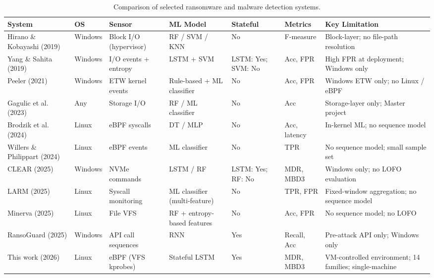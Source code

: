\begin{table}[htbp]
\centering
\small
\caption{Comparison of selected ransomware and malware detection systems.}\label{tab:2-1}
\begin{tabularx}{\textwidth}{XllXllX}
\hline
\textbf{System} & \textbf{OS} & \textbf{Sensor} & \textbf{ML Model} & \textbf{Stateful} & \textbf{Metrics} & \textbf{Key Limitation} \\
\hline
Hirano \& Kobayashi \cite{ref26} (2019) & Windows & Block I/\allowbreak{}O (hypervisor) & RF /\allowbreak{} SVM /\allowbreak{} KNN & No & F-measure & Block-layer; no file-path resolution \\
Yang \& Sahita \cite{ref29} (2019) & Windows & I/\allowbreak{}O events + entropy & LSTM + SVM & LSTM: Yes; SVM: No & Acc, FPR & High FPR at deployment; Windows only \\
Peeler \cite{ref14} (2021) & Windows & ETW kernel events & Rule-based + ML classifier & No & Acc, FPR & Windows ETW only; no Linux /\allowbreak{} eBPF \\
Gagulic et al. \cite{ref25} (2023) & Any & Storage I/\allowbreak{}O & RF /\allowbreak{} ML classifier & No & Acc & Storage-layer only; Master project \\
Brodzik et al. \cite{ref13} (2024) & Linux & eBPF syscalls & DT /\allowbreak{} MLP & No & Acc, latency & In-kernel ML; no sequence model \\
Willers \& Philippart \cite{ref17} (2024) & Linux & eBPF events & ML classifier & No & TPR & No sequence model; small sample set \\
CLEAR \cite{ref9} (2025) & Windows & NVMe commands & \textmu{}LSTM /\allowbreak{} RF & \textmu{}LSTM: Yes; RF: No & MDR, MBD3 & Windows only; no LOFO evaluation \\
LARM \cite{ref33} (2025) & Linux & Syscall monitoring & ML classifier (multi-feature) & No & TPR, FPR & Fixed-window aggregation; no sequence model \\
Minerva \cite{ref20} (2025) & Linux & File VFS & RF + entropy-based features & No & Acc, FPR & No sequence model; no LOFO \\
RansoGuard \cite{ref21} (2025) & Windows & API call sequences & RNN & Yes & Recall, Acc & Pre-attack API only; Windows only \\
This work (2026) & Linux & eBPF (VFS kprobes) & Stateful \textmu{}LSTM & Yes & MDR, MBD3 & VM-controlled environment; 14 families; single-machine \\
\hline
\end{tabularx}
\end{table}

